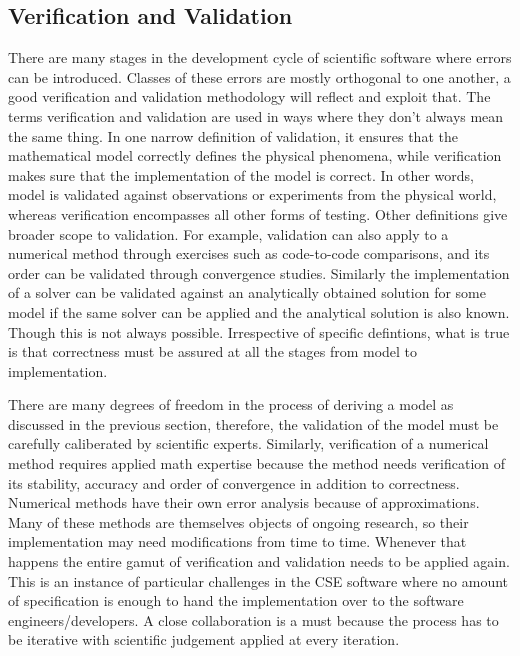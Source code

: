 \subsection{Verification and Validation}
\label{sec:vandv}
There are many stages in the development cycle of scientific software 
where errors can be introduced. Classes of these errors are mostly
orthogonal to one another, a good verification and validation
methodology will reflect and exploit that. The terms verification and 
validation are used in ways where they don't always mean the same
thing. In one narrow definition of validation, it ensures that the
mathematical model correctly defines the physical phenomena, while
verification makes sure that the implementation of the model is
correct. In other words, model is validated against observations or
experiments from the physical world, whereas verification encompasses
all other forms of  testing.   Other definitions give broader scope to
validation. For example, validation can also apply to a numerical
method through exercises such as code-to-code comparisons, and its
order can be validated through convergence studies. Similarly the
implementation of a solver can be validated against an analytically
obtained solution for some model if the same solver can be
applied and the analytical solution is also known.  Though this is not
always possible.  Irrespective of  specific defintions, what is true is that
correctness must be assured at all the stages from model to
implementation.  

There are many degrees of freedom in the process of deriving a
model as discussed in the previous section, therefore, the validation of the
model must be carefully caliberated by scientific experts. Similarly,
verification of a numerical method requires applied math expertise
because the method needs verification of its stability, accuracy and
order of  convergence in addition to correctness. Numerical methods
have their own error analysis because of approximations. Many of
these methods are themselves objects of ongoing research, so their
implementation may need modifications from time to time. Whenever
that happens the entire gamut of verification and validation needs to
be applied again. This is an instance of particular challenges in the
CSE software where no amount of specification is enough to hand the
implementation over to the software engineers/developers. A close
collaboration is a must because the process has to be iterative with
scientific judgement applied at every iteration. 

